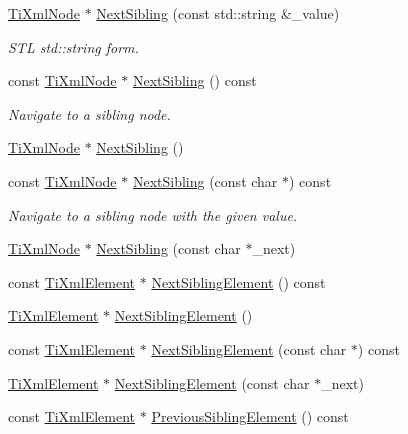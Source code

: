 \begin{DoxyCompactItemize}
\hyperlink{class_ti_xml_node}{Ti\+Xml\+Node} $\ast$ \hyperlink{class_ti_xml_node_a1757c1f4d01e8c9596ffdbd561c76aea}{Next\+Sibling} (const std\+::string \&\+\_\+value)
\begin{DoxyCompactList}\small\item\em S\+TL std\+::string form. \end{DoxyCompactList}\item 
const \hyperlink{class_ti_xml_node}{Ti\+Xml\+Node} $\ast$ \hyperlink{class_ti_xml_node_ae99c572ac7901a15993ea7a4efaa10e7}{Next\+Sibling} () const
\begin{DoxyCompactList}\small\item\em Navigate to a sibling node. \end{DoxyCompactList}\item 
\hyperlink{class_ti_xml_node}{Ti\+Xml\+Node} $\ast$ \hyperlink{class_ti_xml_node_a4d05f7b1d7b470ac6887edd072d4892a}{Next\+Sibling} ()
\item 
const \hyperlink{class_ti_xml_node}{Ti\+Xml\+Node} $\ast$ \hyperlink{class_ti_xml_node_a0864ea784b53cdca0a37829d3391ca4b}{Next\+Sibling} (const char $\ast$) const
\begin{DoxyCompactList}\small\item\em Navigate to a sibling node with the given \textquotesingle{}value\textquotesingle{}. \end{DoxyCompactList}\item 
\hyperlink{class_ti_xml_node}{Ti\+Xml\+Node} $\ast$ \hyperlink{class_ti_xml_node_a4080bc5cc8a5c139e7cf308669e850fc}{Next\+Sibling} (const char $\ast$\+\_\+next)
\item 
const \hyperlink{class_ti_xml_element}{Ti\+Xml\+Element} $\ast$ \hyperlink{class_ti_xml_node_ac6105781c913a42aa7f3f17bd1964f7c}{Next\+Sibling\+Element} () const
\item 
\hyperlink{class_ti_xml_element}{Ti\+Xml\+Element} $\ast$ \hyperlink{class_ti_xml_node_a1b211cb5034655a04358e0e2f6fc5010}{Next\+Sibling\+Element} ()
\item 
const \hyperlink{class_ti_xml_element}{Ti\+Xml\+Element} $\ast$ \hyperlink{class_ti_xml_node_a22def4746238abaee042f99b47ef3c94}{Next\+Sibling\+Element} (const char $\ast$) const
\item 
\hyperlink{class_ti_xml_element}{Ti\+Xml\+Element} $\ast$ \hyperlink{class_ti_xml_node_a6e1ac6b800e18049bc75e9f8e63a8e5f}{Next\+Sibling\+Element} (const char $\ast$\+\_\+next)
\item 
const \hyperlink{class_ti_xml_element}{Ti\+Xml\+Element} $\ast$ \hyperlink{class_ti_xml_node_a410804c6987cc1fbdf3bc6d53a9360fd}{Previous\+Sibling\+Element} () const

\end{DoxyCompactItemize}
